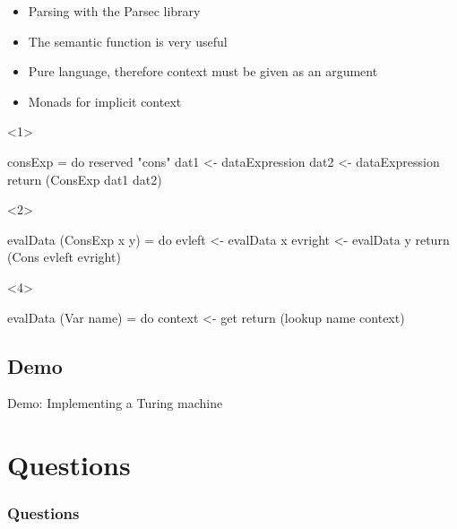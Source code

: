 \documentclass{beamer}
\theoremstyle{definition}
\begin{document}
\begin{frame}[t, fragile]
	\begin{itemize}[<+->]
		\item Parsing with the Parsec library
		\item The semantic function is very useful
		\item Pure language, therefore context must be given as an argument
		\item Monads for implicit context
	\end{itemize}
	\begin{onlyenv}
\begin{code}
consExp = do 
  reserved "cons"
  dat1 <- dataExpression
  dat2 <- dataExpression
  return (ConsExp dat1 dat2)
\end{code}
\end{onlyenv}
	\begin{onlyenv}
\begin{code}
evalData (ConsExp x y) = do
  evleft  <- evalData x
  evright <- evalData y
  return (Cons evleft evright)
\end{code}
\end{onlyenv}
	\begin{onlyenv}
\begin{code}
evalData (Var name) = do
  context <- get
  return (lookup name context)
\end{code}
\end{onlyenv}
\end{frame}

\subsection{Demo}
\begin{frame}{Demo: Implementing a Turing machine}
	
\end{frame}

\section{Questions}
\begin{frame}
	\frametitle{Questions}
\end{frame}
\end{document}

